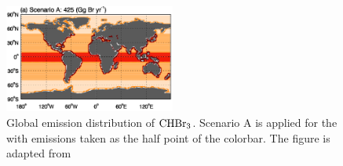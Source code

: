 \begin{figure}
    \centering
    \includegraphics[width = 0.5\textwidth]{Chapter3_Theory_ocean_hetReact/images/liang_etal_2010.png}
    \caption{Global emission distribution of $\mathrm{CHBr_3}$. Scenario A is applied for the  with emissions taken as the half point of the colorbar. The figure is adapted from \cite{Liang2010}}
    \label{fig:Liang2010}
\end{figure}